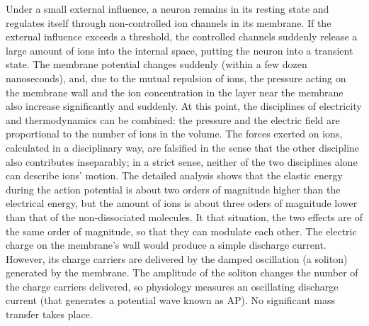 Under a small external influence, a neuron remains in its resting state and regulates itself through non-controlled ion channels in its membrane.
If the external influence exceeds a threshold, the controlled channels suddenly release a large amount of ions into the internal space, putting the neuron into a transient state.
The membrane potential changes suddenly (within a few dozen nanoseconds), and, due to the mutual repulsion of ions, the pressure acting on the membrane wall and the ion concentration in the layer near the membrane also increase significantly and suddenly. At this point, the disciplines of electricity and thermodynamics can be combined: the pressure and the electric field are proportional to the number of ions in the volume.
The forces exerted on ions, calculated in a disciplinary way, are falsified 
in the sense that the other discipline also contributes inseparably; in a strict sense, neither of the two disciplines alone can describe ions' motion.
The detailed analysis shows that the elastic energy during the action potential
is about two orders of magnitude higher than the electrical energy, but the 
amount of ions is about three oders of magnitude lower than that of the non-dissociated molecules.
It that situation, the two effects are of the same order of magnitude,
so that they can modulate each other. The electric charge on the membrane's wall 
would produce a simple discharge current. However, its charge carriers are
delivered by the damped oscillation (a soliton) generated by the membrane.
The amplitude of the soliton changes the number of the charge carriers delivered,
so physiology measures an oscillating discharge current (that generates
a potential wave known as \gls{AP}). No significant mass transfer
takes place.

